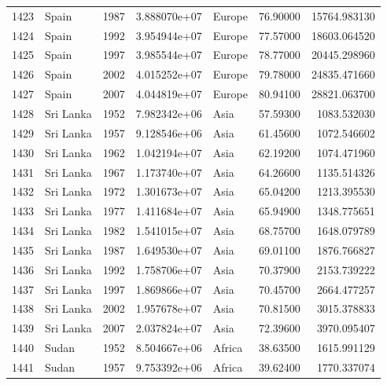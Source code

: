 \documentclass[
  letterpaper,
  DIV=11,
  numbers=noendperiod]{scrreprt}
\begin{document}
\begin{tabular}{llrrlrr}
1423 &                     Spain &  1987 &  3.888070e+07 &    Europe &  76.90000 &   15764.983130 \\
1424 &                     Spain &  1992 &  3.954944e+07 &    Europe &  77.57000 &   18603.064520 \\
1425 &                     Spain &  1997 &  3.985544e+07 &    Europe &  78.77000 &   20445.298960 \\
1426 &                     Spain &  2002 &  4.015252e+07 &    Europe &  79.78000 &   24835.471660 \\
1427 &                     Spain &  2007 &  4.044819e+07 &    Europe &  80.94100 &   28821.063700 \\
1428 &                 Sri Lanka &  1952 &  7.982342e+06 &      Asia &  57.59300 &    1083.532030 \\
1429 &                 Sri Lanka &  1957 &  9.128546e+06 &      Asia &  61.45600 &    1072.546602 \\
1430 &                 Sri Lanka &  1962 &  1.042194e+07 &      Asia &  62.19200 &    1074.471960 \\
1431 &                 Sri Lanka &  1967 &  1.173740e+07 &      Asia &  64.26600 &    1135.514326 \\
1432 &                 Sri Lanka &  1972 &  1.301673e+07 &      Asia &  65.04200 &    1213.395530 \\
1433 &                 Sri Lanka &  1977 &  1.411684e+07 &      Asia &  65.94900 &    1348.775651 \\
1434 &                 Sri Lanka &  1982 &  1.541015e+07 &      Asia &  68.75700 &    1648.079789 \\
1435 &                 Sri Lanka &  1987 &  1.649530e+07 &      Asia &  69.01100 &    1876.766827 \\
1436 &                 Sri Lanka &  1992 &  1.758706e+07 &      Asia &  70.37900 &    2153.739222 \\
1437 &                 Sri Lanka &  1997 &  1.869866e+07 &      Asia &  70.45700 &    2664.477257 \\
1438 &                 Sri Lanka &  2002 &  1.957678e+07 &      Asia &  70.81500 &    3015.378833 \\
1439 &                 Sri Lanka &  2007 &  2.037824e+07 &      Asia &  72.39600 &    3970.095407 \\
1440 &                     Sudan &  1952 &  8.504667e+06 &    Africa &  38.63500 &    1615.991129 \\
1441 &                     Sudan &  1957 &  9.753392e+06 &    Africa &  39.62400 &    1770.337074 \\

\end{tabular}
\end{document}
